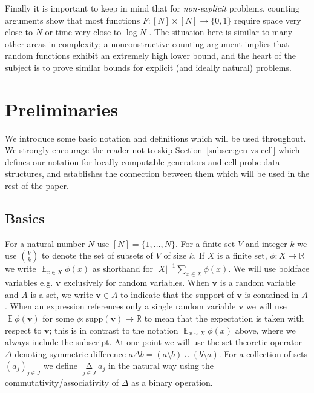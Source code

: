 \documentclass[11pt]{article}
\newcommand{\B}{\{0,1\}}
\newcommand{\supp}{\mathrm{supp}}
\newcommand{\E}{\mathop{\mathbb{E}}}
\newcommand{\N}{[N]}
\begin{document}
Finally it is important to keep in mind that for \emph{non-explicit} problems, counting arguments show that most functions $F: [N] \times [N] \to \B$ require space very close to $N$ or time very close to $\log N$ \cite{miltersen-bit-probe}. The situation here is similar to many other areas in complexity; a nonconstructive counting argument implies that random functions exhibit an extremely high lower bound, and the heart of the subject is to prove similar bounds for explicit (and ideally natural) problems.

\section{Preliminaries}\label{sec:prelims}
We introduce some basic notation and definitions which will be used throughout. We strongly encourage the reader not to skip Section~\ref{subsec:gen-vs-cell} which defines our notation for locally computable generators and cell probe data structures, and establishes the connection between them which will be used in the rest of the paper.
\subsection{Basics}\label{subsec:basic-prelims}
For a natural number $N$ use $\N =\{1,\ldots,N\}$. For a finite set $V$ and integer $k$ we use $\binom{V}{k}$ to denote the set of subsets of $V$ of size $k$. If $X$ is a finite set, $\phi:X \to \mathbb{R}$ we write $\E_{x\in X} \phi(x)$ as shorthand for $|X|^{-1}\sum_{x \in X} \phi(x)$.
We will use boldface variables e.g. $\bm{v}$ exclusively for random variables. When $\bm{v}$ is a random variable and $A$ is a set, we write $\bm{v} \in A$ to indicate that the support of $\bm{v}$ is contained in $A$. When an expression references only a single random variable $\bm{v}$ we will use $\E \phi(\bm{v})$ for some $\phi: \supp(\bm{v}) \to \mathbb{R}$ to mean that the expectation is taken with respect to $\bm{v}$; this is in contrast to the notation $\E_{x\sim X} \phi(x)$ above, where we always include the subscript.
At one point we will use the set theoretic operator $\Delta$ denoting symmetric difference $a \Delta b = (a \setminus b) \cup (b \setminus a)$. For a collection of sets $(a_j)_{j \in J}$ we define $\mathop{\Delta}\limits_{j \in J} a_j$ in the natural way using the commutativity/associativity of $\Delta$ as a binary operation.
\end{document}
